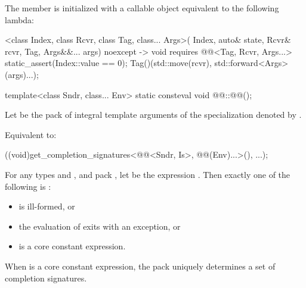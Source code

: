 \pnum
The member 
is initialized with a callable object equivalent to the following lambda:
\begin{codeblock}
[]<class Index, class Rcvr, class Tag, class... Args>(
  Index, auto& state, Rcvr& rcvr, Tag, Args&&... args) noexcept
    -> void requires @@<Tag, Rcvr, Args...> {
  static_assert(Index::value == 0);
  Tag()(std::move(rcvr), std::forward<Args>(args)...);
}
\end{codeblock}

%
\begin{itemdecl}
template<class Sndr, class... Env>
  static consteval void @@::@@();
\end{itemdecl}

\begin{itemdescr}
\pnum
Let  be the pack of integral template arguments of
the  specialization denoted by
.

\pnum
\effects
Equivalent to:
\begin{codeblock}
((void)get_completion_signatures<@@<Sndr, Is>, @@(Env)...>(), ...);
\end{codeblock}

\pnum
\begin{note}
For any types  and , and pack ,
let  be the expression
.
Then exactly one of the following is :
\begin{itemize}
\item {} is ill-formed, or
\item the evaluation of  exits with an exception, or
\item {} is a core constant expression.
\end{itemize}
When  is a core constant expression,
the pack  uniquely determines a set of completion signatures.
\end{note}
\end{itemdescr}

